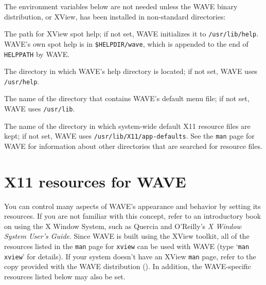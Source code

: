 \documentclass[twoside]{book}
\newcommand{\WAVE}{{\sf WAVE}\xspace}
\begin{document}
The environment variables below are not needed unless the \WAVE{} binary
distribution, or XView,
has been installed in non-standard directories:

\begin{description}

\item[{\tt HELPPATH}]
The path for XView spot help;  if not set, \WAVE{} initializes it to
{\tt /usr/lib/help}.  \WAVE{}'s own spot help is in
{\tt \$HELPDIR/wave}, which is appended to the end of {\tt HELPPATH}
by \WAVE{}.

\item[{\tt HELPDIR}]
The directory in which \WAVE{}'s help directory is located;  if not set,
\WAVE{} uses {\tt /usr/help}.

\item[{\tt MENUDIR}]
The name of the directory that contains \WAVE{}'s default menu file;
if not set, \WAVE{} uses {\tt /usr/lib}.

\item[{\tt RESDIR}]
The name of the directory in which system-wide default X11 resource files
are kept;  if not set, \WAVE{} uses {\tt /usr/lib/X11/app-defaults}.
See the {\tt man} page for \WAVE{} for information about other
directories that are searched for resource files.
\end{description}

\section{X11 resources for \WAVE{}}

\label{sec:resources}
You can control many aspects of \WAVE{}'s appearance and behavior by
setting its resources.  If you are not familiar with this concept, refer to an
introductory book on using the X Window System, such as Quercia and O'Reilly's
{\it X Window System User's Guide}.  Since \WAVE{} is built using the XView
toolkit,
all of the resources listed in the {\tt man} page for {\tt xview}
can be used with \WAVE{} (type `{\tt man xview}' for details).
If your system doesn't have an XView {\tt man} page, refer to the copy provided
with the \WAVE{} distribution
().
In addition, the \WAVE{}-specific resources listed below may also be set.
\end{document}
